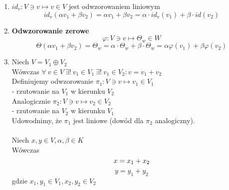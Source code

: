 \documentclass[a5paper,8pt]{article}
\newcommand\tab[1][1cm]{\hspace*{#1}}
\begin{document}
    \begin{enumerate}[label=\textbf{\arabic*})]
        \item
            $ id_v: V \ni v \longmapsto v \in V $ jest odwzorowaniem liniowym
            \begin{equation*}
                id_v(\alpha v_1 + \beta v_2) = \alpha v_1 + \beta v_2
                = \alpha \cdot id_v (v_1) + \beta \cdot id(v_2)
            \end{equation*}
        \item
            \textbf{Odwzorowanie zerowe} \\
            \begin{equation*}
                \varphi: V \ni v \longmapsto \Theta_w \in W
            \end{equation*}
            \begin{equation*}
                \Theta(\alpha v_1 + \beta v_2) = \Theta_w
                = \alpha \cdot \Theta_w + \beta \cdot \Theta_w
                = \alpha \varphi(v_1) + \beta \varphi(v_2)
            \end{equation*}
        \item
            Niech $ V = V_1 \oplus V_2 $ \\
            Wówczas $ \forall ~v \in V ~ \exists! ~ v_1 \in V_1 ~ \exists! ~ v_1 \in V_2:
            v = v_1 + v_2 $ \\

            Definiujemy odwzorowanie $ \pi_1 : V \ni v \longmapsto v_1 \in V_1 $ \\
            \tab - rzutowanie na $ V_1 $ w kierunku $ V_2 $ \\

            Analogicznie $ \pi_2 : V \ni v \longmapsto v_2 \in V_2 $ \\
            \tab - rzutowanie na $ V_2 $ w kierunku $ V_1 $ \\

            \newpage
            Udowodnimy, że $\pi_1$ jest liniowe (dowód dla $\pi_2$ analogiczny).\\\\
            Niech $ x, y \in V, \alpha , \beta \in K $\\
            Wówczas \\
            \begin{equation*}
                x = x_1 + x_2 \\
            \end{equation*}
            \begin{equation*}
                y = y_1 + y_2
            \end{equation*}
                gdzie $ x_1, y_1 \in V_1, x_2, y_2 \in V_2 $


\end{enumerate}
\end{document}
